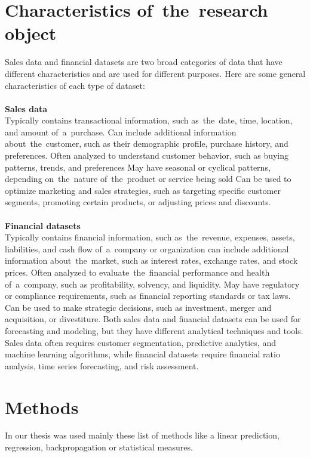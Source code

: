     \section{Characteristics of~the~research object}\label{subsec:research_object}
    Sales data and financial datasets are two broad categories of data that have different characteristics and are used
    for different purposes. Here are some general characteristics of each type of dataset:\\
    \\
    \textbf{Sales data}\\
    Typically contains transactional information, such as~the~date, time, location, and amount of~a~purchase. Can include additional information about~the~customer, such as their demographic profile, purchase history, and
    preferences. Often analyzed to understand customer behavior, such as buying patterns, trends, and preferences
    May have seasonal or cyclical patterns, depending on~the~nature of~the~product or service being sold
    Can be used to optimize marketing and sales strategies, such as targeting specific customer segments, promoting
    certain products, or adjusting prices and discounts.\\
    \\
    \textbf{Financial datasets}\\
    Typically contains financial information, such as~the~revenue, expenses, assets, liabilities, and cash
    flow of~a~company or organization can include additional information about~the~market, such as interest rates,
    exchange rates, and stock prices. Often analyzed to evaluate~the~financial performance and health of~a~company,
    such as profitability, solvency, and liquidity. May have regulatory or compliance requirements, such as financial
    reporting standards or tax laws. Can be used to make strategic decisions, such as investment, merger and
    acquisition, or divestiture. Both sales data and financial datasets can be used for forecasting and modeling,
    but they have different analytical techniques and tools. Sales data often requires customer segmentation,
    predictive analytics, and machine learning algorithms, while financial datasets require financial ratio analysis,
    time series forecasting, and risk assessment.
    \section{Methods}\label{subsec:methods}
    In our thesis was used mainly these list of methods like a linear prediction, regression, backpropagation or statistical  measures.
